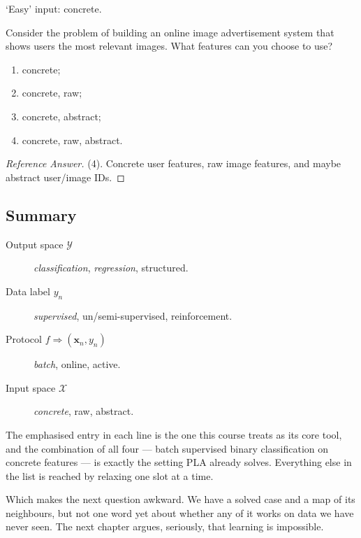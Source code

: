 \begin{moral}
    `Easy' input: concrete.
\end{moral}

\begin{exercise}
    Consider the problem of building an online image advertisement system that
    shows users the most relevant images. What features can you choose to use?
    \begin{enumerate}[(1)]
        \item concrete;
        \item concrete, raw;
        \item concrete, abstract;
        \item concrete, raw, abstract.
    \end{enumerate}
\end{exercise}

\begin{proof}[Reference Answer]
    (4). Concrete user features, raw image features, and maybe abstract
    user\slash image IDs.
\end{proof}

\hrulebar

\subsection*{Summary}

\begin{description}
    \item[Output space \(\mathcal{Y}\)] \emph{classification},
        \emph{regression}, structured.
    \item[Data label \(y_n\)] \emph{supervised}, un/semi-supervised,
        reinforcement.
    \item[Protocol \(f \Rightarrow (\bm{x}_n, y_n)\)] \emph{batch}, online,
        active.
    \item[Input space \(\mathcal{X}\)] \emph{concrete}, raw, abstract.
\end{description}

The emphasised entry in each line is the one this course treats as its core
tool, and the combination of all four --- batch supervised binary
classification on concrete features --- is exactly the setting PLA already
solves. Everything else in the list is reached by relaxing one slot at a time.

Which makes the next question awkward. We have a solved case and a map of its
neighbours, but not one word yet about whether any of it works on data we have
never seen. The next chapter argues, seriously, that learning is impossible.
